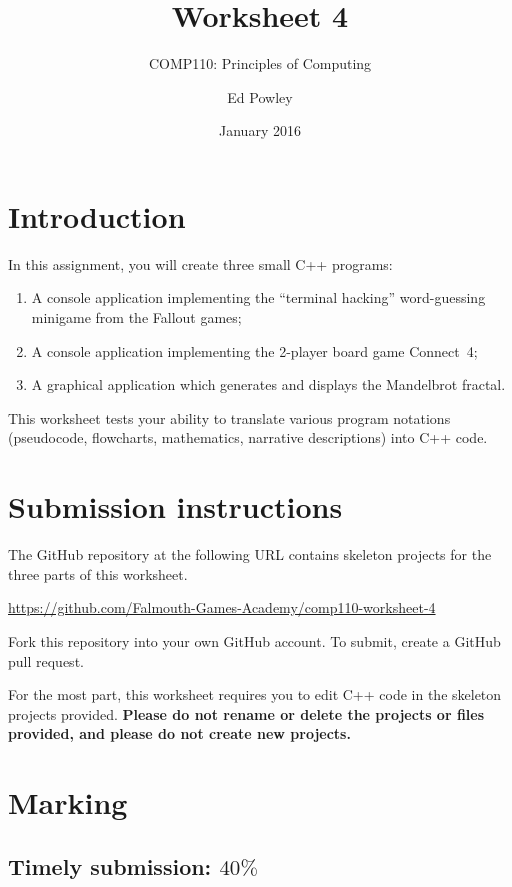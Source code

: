 \documentclass{scrartcl}
\title{Worksheet 4}
\subtitle{COMP110: Principles of Computing}
\author{Ed Powley}
\date{January 2016}
\begin{document}
\maketitle

\section*{Introduction}

In this assignment, you will create three small C++ programs:
\begin{enumerate}[label=\Alph*.]
	\item A console application implementing the ``terminal hacking'' word-guessing minigame from the Fallout games;
	\item A console application implementing the 2-player board game Connect~4;
	\item A graphical application which generates and displays the Mandelbrot fractal.
\end{enumerate}

This worksheet tests your ability to translate various program notations (pseudocode, flowcharts,
mathematics, narrative descriptions) into C++ code.

\section*{Submission instructions}

The GitHub repository at the following URL contains skeleton projects for the three parts of this worksheet.
\begin{center}
\url{https://github.com/Falmouth-Games-Academy/comp110-worksheet-4}
\end{center}
Fork this repository into your own GitHub account. To submit, create a GitHub pull request.

For the most part, this worksheet requires you to edit C++ code in the skeleton projects provided.
\textbf{Please do not rename or delete the projects or files provided, and please do not create new projects.}

\section*{Marking}

\subsection*{Timely submission: $40\%$}
\end{document}
